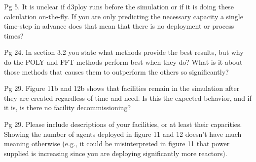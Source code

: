 \documentclass[answers,11pt]{exam}
\begin{document}
\begin{questions}
\question
Pg 5. It is unclear if d3ploy runs before the simulation or if it is 
doing these calculation on-the-fly. If you are only predicting the 
necessary capacity a single time-step in advance does that mean that 
there is no deployment or process times?

\begin{solution}
\end{solution}

\question
Pg 24. In section 3.2 you state what methods provide the best results, but why do the 
POLY and FFT methods perform best when they do? What is it about those methods that 
causes them to outperform the others so significantly?

\begin{solution}
\end{solution}

\question 
Pg 29. Figure 11b and 12b shows that facilities remain in the simulation after 
they are created regardless of time and need. Is this the expected behavior, 
and if it is, is there no facility decommissioning?

\begin{solution}
\end{solution}

\question
Pg 29. Please include descriptions of your facilities, or at least their capacities. 
Showing the number of agents deployed in figure 11 and 12 doesn't have much meaning 
otherwise (e.g., it could be misinterpreted in figure 11 that power supplied is 
increasing since you are deploying significantly more reactors).

\begin{solution}
\end{solution}

\end{questions}


  
\end{document}
